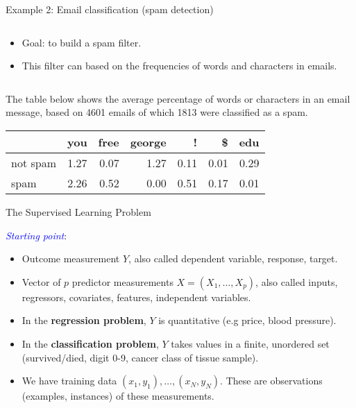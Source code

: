 \documentclass[ignorenonframetext,]{beamer}
\providecommand{\tightlist}{%
  \setlength{\itemsep}{0pt}\setlength{\parskip}{0pt}}
\begin{document}
\begin{frame}

\begin{block}{Example 2: Email classification (spam detection)}

\(~\)

\begin{itemize}
\tightlist
\item
  Goal: to build a spam filter.
\end{itemize}

\vspace{1mm}

\begin{itemize}
\tightlist
\item
  This filter can based on the frequencies of words and characters in
  emails.
\end{itemize}

\(~\)

The table below shows the average percentage of words or characters in
an email message, based on 4601 emails of which 1813 were classified as
a spam.

\begin{longtable}[]{@{}lrrrrrr@{}}
\toprule
& you & free & george & ! & \$ & edu\tabularnewline
\midrule
\endhead
not spam & 1.27 & 0.07 & 1.27 & 0.11 & 0.01 & 0.29\tabularnewline
spam & 2.26 & 0.52 & 0.00 & 0.51 & 0.17 & 0.01\tabularnewline
\bottomrule
\end{longtable}

\end{block}

\end{frame}

\begin{frame}{The Supervised Learning Problem}
\protect\hypertarget{the-supervised-learning-problem}{}

\textcolor{blue}{\emph{Starting point}}:

\begin{itemize}
\item
  Outcome measurement \(Y\), also called dependent variable, response,
  target.
\item
  Vector of \(p\) predictor measurements \(X=(X_1,\ldots,X_p)\), also
  called inputs, regressors, covariates, features, independent
  variables.
\item
  In the \textbf{regression problem}, \(Y\) is quantitative (e.g price,
  blood pressure).
\item
  In the \textbf{classification problem}, \(Y\) takes values in a
  finite, unordered set (survived/died, digit 0-9, cancer class of
  tissue sample).
\item
  We have training data \((x_1, y_1), \ldots , (x_N , y_N )\). These are
  observations (examples, instances) of these measurements.
\end{itemize}

\end{frame}
\end{document}
